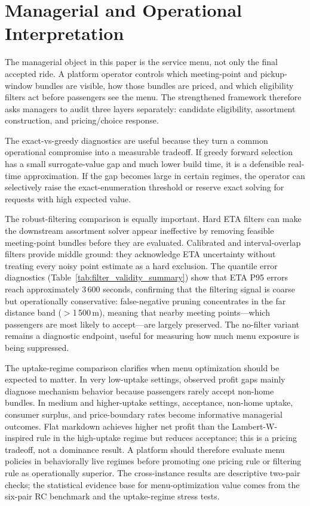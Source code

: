 \section{Managerial and Operational Interpretation}

The managerial object in this paper is the service menu, not only the final accepted ride. A platform operator controls which meeting-point and pickup-window bundles are visible, how those bundles are priced, and which eligibility filters act before passengers see the menu. The strengthened framework therefore asks managers to audit three layers separately: candidate eligibility, assortment construction, and pricing/choice response.

The exact-vs-greedy diagnostics are useful because they turn a common operational compromise into a measurable tradeoff. If greedy forward selection has a small surrogate-value gap and much lower build time, it is a defensible real-time approximation. If the gap becomes large in certain regimes, the operator can selectively raise the exact-enumeration threshold or reserve exact solving for requests with high expected value.

The robust-filtering comparison is equally important. Hard ETA filters can make the downstream assortment solver appear ineffective by removing feasible meeting-point bundles before they are evaluated. Calibrated and interval-overlap filters provide middle ground: they acknowledge ETA uncertainty without treating every noisy point estimate as a hard exclusion. The quantile error diagnostics (Table~\ref{tab:filter_validity_summary}) show that ETA P95 errors reach approximately 3\,600 seconds, confirming that the filtering signal is coarse but operationally conservative: false-negative pruning concentrates in the far distance band ($>$1\,500\,m), meaning that nearby meeting points---which passengers are most likely to accept---are largely preserved. The no-filter variant remains a diagnostic endpoint, useful for measuring how much menu exposure is being suppressed.

The uptake-regime comparison clarifies when menu optimization should be expected to matter. In very low-uptake settings, observed profit gaps mainly diagnose mechanism behavior because passengers rarely accept non-home bundles. In medium and higher-uptake settings, acceptance, non-home uptake, consumer surplus, and price-boundary rates become informative managerial outcomes. Flat markdown achieves higher net profit than the Lambert-W-inspired rule in the high-uptake regime but reduces acceptance; this is a pricing tradeoff, not a dominance result. A platform should therefore evaluate menu policies in behaviorally live regimes before promoting one pricing rule or filtering rule as operationally superior. The cross-instance results are descriptive two-pair checks; the statistical evidence base for menu-optimization value comes from the six-pair RC benchmark and the uptake-regime stress tests.

